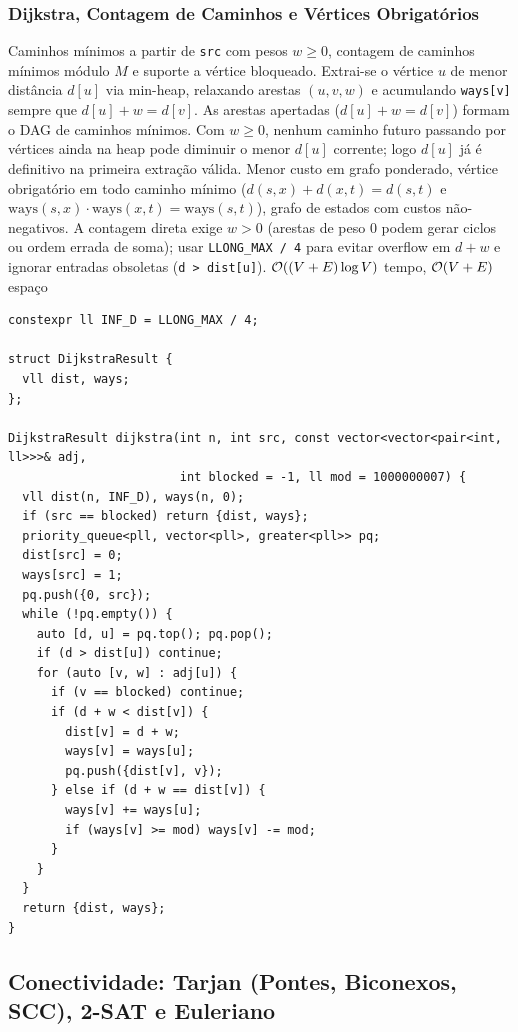 \subsubsection{Dijkstra, Contagem de Caminhos e Vértices Obrigatórios}
\algobox
  {Caminhos mínimos a partir de \texttt{src} com pesos $w \ge 0$, contagem de caminhos mínimos módulo $M$ e suporte a vértice bloqueado.}
  {Extrai-se o vértice $u$ de menor distância $d[u]$ via min-heap, relaxando arestas $(u, v, w)$ e acumulando \texttt{ways[v]} sempre que $d[u] + w = d[v]$. As arestas apertadas ($d[u] + w = d[v]$) formam o DAG de caminhos mínimos.}
  {Com $w \ge 0$, nenhum caminho futuro passando por vértices ainda na heap pode diminuir o menor $d[u]$ corrente; logo $d[u]$ já é definitivo na primeira extração válida.}
  {Menor custo em grafo ponderado, vértice obrigatório em todo caminho mínimo ($d(s,x)+d(x,t)=d(s,t)$ e $\text{ways}(s,x)\cdot\text{ways}(x,t)=\text{ways}(s,t)$), grafo de estados com custos não-negativos.}
  {A contagem direta exige $w > 0$ (arestas de peso $0$ podem gerar ciclos ou ordem errada de soma); usar \texttt{LLONG\_MAX / 4} para evitar overflow em $d + w$ e ignorar entradas obsoletas (\texttt{d > dist[u]}).}
  {$\mathcal{O}((V + E) \log V)$ tempo, $\mathcal{O}(V + E)$ espaço}

\begin{lstlisting}
constexpr ll INF_D = LLONG_MAX / 4;

struct DijkstraResult {
  vll dist, ways;
};

DijkstraResult dijkstra(int n, int src, const vector<vector<pair<int, ll>>>& adj,
                        int blocked = -1, ll mod = 1000000007) {
  vll dist(n, INF_D), ways(n, 0);
  if (src == blocked) return {dist, ways};
  priority_queue<pll, vector<pll>, greater<pll>> pq;
  dist[src] = 0;
  ways[src] = 1;
  pq.push({0, src});
  while (!pq.empty()) {
    auto [d, u] = pq.top(); pq.pop();
    if (d > dist[u]) continue;
    for (auto [v, w] : adj[u]) {
      if (v == blocked) continue;
      if (d + w < dist[v]) {
        dist[v] = d + w;
        ways[v] = ways[u];
        pq.push({dist[v], v});
      } else if (d + w == dist[v]) {
        ways[v] += ways[u];
        if (ways[v] >= mod) ways[v] -= mod;
      }
    }
  }
  return {dist, ways};
}
\end{lstlisting}

\subsection{Conectividade: Tarjan (Pontes, Biconexos, SCC), 2-SAT e Euleriano}

